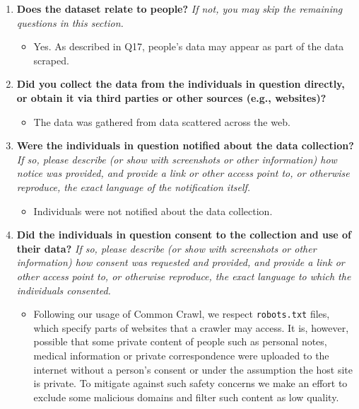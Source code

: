 \documentclass{article}
\newcommand{\commoncrawl}{Common Crawl\xspace}
\begin{document}
\begin{enumerate}[label=Q\arabic*, resume]
\item \textbf{Does the dataset relate to people?} \textit{If not, you may skip the remaining questions in this section.}

\begin{itemize}
\item Yes. As described in Q17, people's data may appear as part of the data scraped.
\end{itemize}

\item \textbf{Did you collect the data from the individuals in question directly, or obtain it via third parties or other sources (e.g., websites)?}


\begin{itemize}
\item The data was gathered from data scattered across the web.
\end{itemize}

\item \textbf{Were the individuals in question notified about the data collection?} \textit{If so, please describe (or show with screenshots or other information) how notice was provided, and provide a link or other access point to, or otherwise reproduce, the exact language of the notification itself.}

\begin{itemize}
\item Individuals were not notified about the data collection.
\end{itemize}

\item \textbf{Did the individuals in question consent to the collection and use of their data?} \textit{If so, please describe (or show with screenshots or other information) how consent was requested and provided, and provide a link or other access point to, or otherwise reproduce, the exact language to which the individuals consented.}

\begin{itemize}
\item Following our usage of \commoncrawl, we respect \texttt{robots.txt} files, which specify parts of websites that a crawler may access. It is, however, possible that some private content of people such as personal notes, medical information or private correspondence were uploaded to the internet without a person's consent or under the assumption the host site is private. To mitigate against such safety concerns we make an effort to exclude some malicious domains and filter such content as low quality.
\end{itemize}


\end{enumerate}
\end{document}
